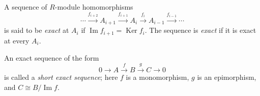A sequence of $R$-module homomorphisms
\[
\cdots \xrightarrow{f_{i+2}} A_{i+1} \xrightarrow{f_{i+1}} A_i \xrightarrow{f_i} A_{i-1} \xrightarrow{f_{i-1}} \cdots
\]
is said to be \emph{exact} at $A_i$ if $\operatorname{Im} f_{i+1} = \operatorname{Ker} f_i$. The sequence is \emph{exact} if it is exact at every $A_i$.

An exact sequence of the form
\[
0 \to A \xrightarrow{f} B \xrightarrow{g} C \to 0
\]
is called a \emph{short exact sequence}; here $f$ is a monomorphism, $g$ is an epimorphism, and $C \cong B / \operatorname{Im} f$.
